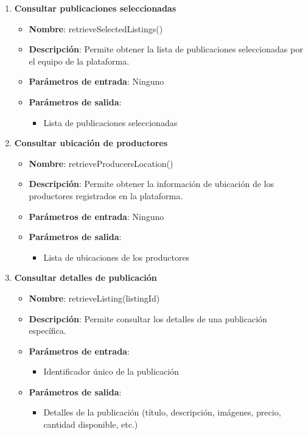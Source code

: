 \begin{enumerate}[label=SOP-\protect\twodigits{\arabic*}:, align=left, leftmargin=*]
\item \textbf{Consultar publicaciones seleccionadas}
\begin{itemize}
\item \textbf{Nombre}: retrieveSelectedListings()
\item \textbf{Descripción}: Permite obtener la lista de publicaciones seleccionadas por el equipo de la plataforma.
\item \textbf{Parámetros de entrada}: Ninguno
\item \textbf{Parámetros de salida}:
\begin{itemize}
\item Lista de publicaciones seleccionadas
\end{itemize}
\end{itemize}

\item \textbf{Consultar ubicación de productores}
\begin{itemize}
\item \textbf{Nombre}: retrieveProducersLocation()
\item \textbf{Descripción}: Permite obtener la información de ubicación de los productores registrados en la plataforma.
\item \textbf{Parámetros de entrada}: Ninguno
\item \textbf{Parámetros de salida}:
\begin{itemize}
\item Lista de ubicaciones de los productores
\end{itemize}
\end{itemize}

\item \textbf{Consultar detalles de publicación}
\begin{itemize}
\item \textbf{Nombre}: retrieveListing(listingId)
\item \textbf{Descripción}: Permite consultar los detalles de una publicación específica.
\item \textbf{Parámetros de entrada}:
\begin{itemize}
\item Identificador único de la publicación
\end{itemize}
\item \textbf{Parámetros de salida}:
\begin{itemize}
\item Detalles de la publicación (título, descripción, imágenes, precio, cantidad disponible, etc.)
\end{itemize}
\end{itemize}


\end{enumerate}
